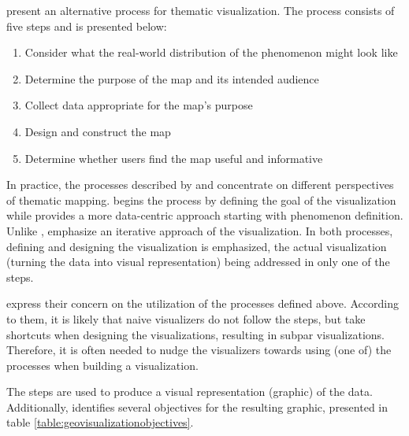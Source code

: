 \citet[chap.~1]{slocum_thematic_2014} present an alternative process for thematic visualization. The process consists of five steps and is presented below:

\begin{enumerate}
	\item Consider what the real-world distribution of the phenomenon might look like
	\item Determine the purpose of the map and its intended audience
	\item Collect data appropriate for the map's purpose
	\item Design and construct the map
	\item Determine whether users find the map useful and informative
\end{enumerate}

In practice, the processes described by \citeauthor{schlichtmann_visualization_2002} and \citeauthor{slocum_thematic_2014} concentrate on different perspectives of thematic mapping. \citeauthor{schlichtmann_visualization_2002} begins the process by defining the goal of the visualization while \citeauthor{slocum_thematic_2014} provides a more data-centric approach starting with phenomenon definition. Unlike \citeauthor{schlichtmann_visualization_2002}, \citeauthor{slocum_thematic_2014} emphasize an iterative approach of the visualization. In both processes, defining and designing the visualization is emphasized, the actual visualization (turning the data into visual representation) being addressed in only one of the steps.

\citet[chap.~1]{slocum_thematic_2014} express their concern on the utilization of the processes defined above. According to them, it is likely that naive visualizers do not follow the steps, but take shortcuts when designing the visualizations, resulting in subpar visualizations. Therefore, it is often needed to nudge the visualizers towards using (one of) the processes when building a visualization.

The steps are used to produce a visual representation (graphic) of the data. Additionally, \citet{schlichtmann_visualization_2002} identifies several objectives for the resulting graphic, presented in table \ref{table:geovisualizationobjectives}.

